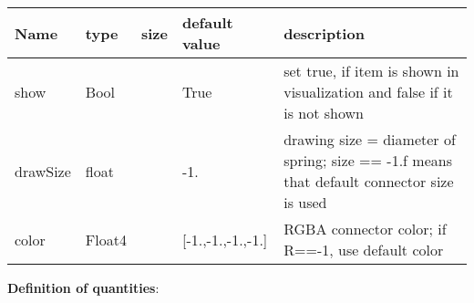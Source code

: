 \begin{center}
  \footnotesize
  \begin{longtable}{| p{4.5cm} | p{2.5cm} | p{0.5cm} | p{2.5cm} | p{6cm} |}
    \hline
    \bf Name & \bf type & \bf size & \bf default value & \bf description \\ \hline
    show &     Bool &      &     True &     set true, if item is shown in visualization and false if it is not shown\\ \hline
    drawSize &     float &      &     -1. &     drawing size = diameter of spring; size == -1.f means that default connector size is used\\ \hline
    color &     Float4 &      &     [-1.,-1.,-1.,-1.] &     RGBA connector color; if R==-1, use default color\\ \hline
	  \end{longtable}
	\end{center}
{\bf Definition of quantities}:\\
\newpage

